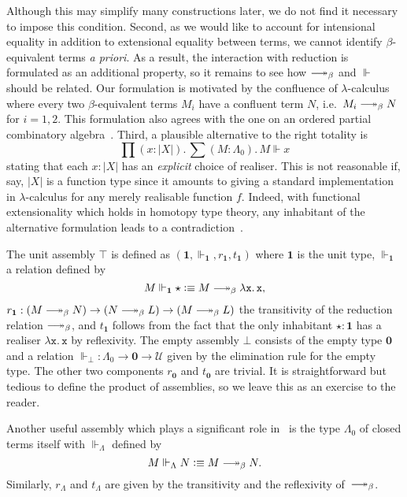 \documentclass[a4paper,UKenglish,numberwithinsect,cleveref,thm-restate]{lipics-v2021}
\newcommand{\defeq}{\vcentcolon\equiv}
\newcommand{\Univ}{\mathcal{U}}
\newcommand{\Unit}{\mathbf{1}}
\newcommand{\Empty}{\mathbf{0}}
\DeclareRobustCommand\longtwoheadrightarrow{\relbar\joinrel\twoheadrightarrow}
\newcommand{\reduce}{\longtwoheadrightarrow_{\beta}}
\theoremstyle{plain}
\begin{document}
Although this may simplify many constructions later, we do not find it necessary to impose this condition.
Second, as we would like to account for intensional equality in addition to extensional equality between terms,
we cannot identify $\beta$-equivalent terms \emph{a priori}.
As a result, the interaction with reduction is formulated as an additional property, so it remains to see how $\reduce$ and $\Vdash$ should be related. 
Our formulation is motivated by the confluence of $\lambda$-calculus where every two $\beta$-equivalent terms $M_i$ have a confluent term $N$, i.e.\ $M_i \reduce N$ for $i = 1, 2$.
This formulation also agrees with the one on an ordered partial combinatory algebra~\cite[Section~2.3]{Hofstra2003}.
Third, a plausible alternative to the right totality is
\[
  \prod (x : |X|).\, \sum (M : \Lambda_0).\, M \Vdash x
\]
stating that each $x : |X|$ has an \emph{explicit} choice of realiser.
This is not reasonable if, say, $|X|$ is a function type since it amounts to giving a standard implementation in $\lambda$-calculus for any merely realisable function $f$.
Indeed, with functional extensionality which holds in homotopy type theory, any inhabitant of the alternative formulation leads to a contradiction~\cite{Troelstra1977}. 

\begin{example}
  The unit assembly $\top$ is defined as $(\Unit, \Vdash_{\Unit}, r_{\Unit}, t_{\Unit})$ where $\Unit$ is the unit type,  
  $\Vdash_{\Unit}$ a relation defined by
  \[
    M \Vdash_{\Unit} \star \defeq M \reduce \mathtt{\lambda x.\, x}, 
  \]
  $r_{\Unit}: (M \reduce N) \to (N \reduce L) \to (M \reduce L)$ the transitivity of the reduction relation $\reduce$,
  and $t_{\Unit}$ follows from the fact that the only inhabitant $\star : \Unit$ has a realiser $\mathtt{\lambda x.\, x}$ by reflexivity.
  The empty assembly $\bot$ consists of the empty type $\Empty$ and a relation $\Vdash_\bot : \Lambda_0 \to \Empty \to \Univ$ given by the elimination rule for the empty type. The other two components $r_\Empty$ and $t_\Empty$ are trivial.
  It is straightforward but tedious to define the product of assemblies, so we leave this as an exercise to the reader. 
\end{example}


\begin{example}
  Another useful assembly which plays a significant role in~ is the type $\Lambda_0$ of closed terms itself with $\Vdash_\Lambda$ defined by
  \[
    M \Vdash_\Lambda N \defeq M \reduce N.
  \]
  Similarly, $r_\Lambda$ and $t_\Lambda$ are given by the transitivity and the reflexivity of~$\reduce$.
  
\end{example}
\end{document}
